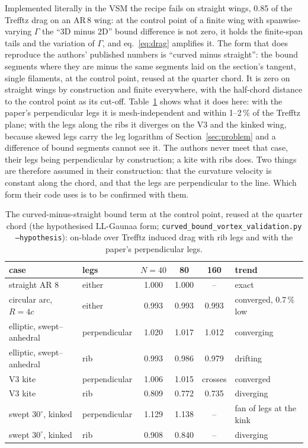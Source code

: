 \documentclass[11pt,a4paper]{article}
\begin{document}
Implemented literally in the VSM the recipe fails on straight wings, 0.85 of the Trefftz drag on an AR\,8 wing: at the control point of a finite wing with spanwise-varying $\Gamma$ the ``3D minus 2D'' bound difference is not zero, it holds the finite-span tails and the variation of $\Gamma$, and eq.~\eqref{eq:drag} amplifies it. The form that does reproduce the authors' published numbers is ``curved minus straight'': the bound segments where they are minus the same segments laid on the section's tangent, single filaments, at the control point, reused at the quarter chord. It is zero on straight wings by construction and finite everywhere, with the half-chord distance to the control point as its cut-off. Table~\ref{tab:hyp} shows what it does here: with the paper's perpendicular legs it is mesh-independent and within 1--2\,\% of the Trefftz plane; with the legs along the ribs it diverges on the V3 and the kinked wing, because skewed legs carry the leg logarithm of Section~\ref{sec:problem} and a difference of bound segments cannot see it. The authors never meet that case, their legs being perpendicular by construction; a kite with ribs does. Two things are therefore assumed in their construction: that the curvature velocity is constant along the chord, and that the legs are perpendicular to the line. Which form their code uses is to be confirmed with them.

\begin{table}[h]\centering\small
\caption{The curved-minus-straight bound term at the control point, reused at the quarter chord (the hypothesised LL-Gaunaa form; \texttt{curved\_bound\_vortex\_validation.py --hypothesis}): on-blade over Trefftz induced drag with rib legs and with the paper's perpendicular legs.}
\label{tab:hyp}
\begin{tabular}{llcccl}
\toprule
case & legs & $N=40$ & 80 & 160 & trend\\
\midrule
straight AR 8 & either & 1.000 & 1.000 & -- & exact\\
circular arc, $R=4c$ & either & 0.993 & 0.993 & 0.993 & converged, 0.7\,\% low\\
elliptic, swept--anhedral & perpendicular & 1.020 & 1.017 & 1.012 & converging\\
elliptic, swept--anhedral & rib & 0.993 & 0.986 & 0.979 & drifting\\
V3 kite & perpendicular & 1.006 & 1.015 & crosses & converged\\
V3 kite & rib & 0.809 & 0.772 & 0.735 & diverging\\
swept $30^\circ$, kinked & perpendicular & 1.129 & 1.138 & -- & fan of legs at the kink\\
swept $30^\circ$, kinked & rib & 0.908 & 0.840 & -- & diverging\\
\bottomrule
\end{tabular}
\end{table}
\end{document}
